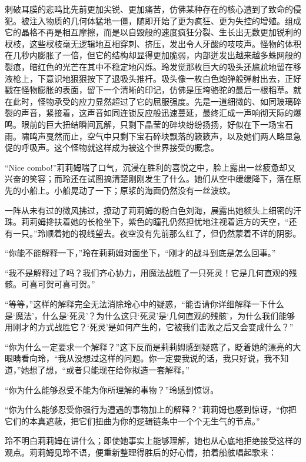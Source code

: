 刺破耳膜的悲鸣比先前更加尖锐、更加痛苦，仿佛某种存在的核心遭到了致命的侵犯。被注入物质的几何体猛地一僵，随即开始了更为疯狂、更为失控的增殖。组成它的晶格不再是相互摩擦，而是以自毁般的速度疯狂分裂、生长出无数更加锐利的杈枝，这些杈枝毫无逻辑地互相穿刺、挤压，发出令人牙酸的吱吱声。怪物的体积在几秒内膨胀了一倍，但它的结构却显得更加脆弱，内部迸发出越来越多蛛网般的裂痕，暗红色的光芒在其中不稳定地闪烁。玲发觉那枚巨大的吸头还尴尬地留在移液枪上，下意识地狠狠按下了退吸头推杆。吸头像一枚白色炮弹般弹射出去，正好戳在怪物膨胀的表面，留下一个清晰的印记，仿佛是压垮骆驼的最后一根稻草。就在此时，怪物承受的应力显然超过了它的屈服强度。先是一道细微的、如同玻璃碎裂的声音，紧接着，这声音如同连锁反应般迅速蔓延，最终汇成一声响彻天际的爆鸣。眼前的巨大扭结瞬间瓦解，只剩下晶莹的碎块纷纷扬扬，好似在下一场宝石雨。啸鸣声戛然而止，空气中只剩下宝石碎块飘落的簌簌声，以及她们两人略显急促的呼吸声。这个怪物就这样成为被这个世界接受的概念。

“Nice combo!”莉莉姆喘了口气，沉浸在胜利的喜悦之中，脸上露出一丝疲惫却又兴奋的笑容；而玲还在试图搞清楚刚刚发生了什么。她们从空中缓缓降下，落在原先的小船上。小船晃动了一下；原浆的海面仍然没有一丝波纹。

一阵从未有过的微风拂过，撩动了莉莉姆的粉白色刘海，展露出她额头上细密的汗珠。莉莉姆搀扶着她的长枪坐下，紫色的瞳孔仍然担忧地注视着远方的天空，“还有一只。”玲顺着她的视线望去。夜空没有先前那么红了，但仍然蒙着不详的阴影。

“你能不能解释一下，”玲在莉莉姆对面坐下，“刚才的战斗到底是怎么回事。”

“我不是解释过了吗？我们齐心协力，用魔法战胜了一只死灵！它是几何直观的残骸。可喜可贺可喜可贺。”

“等等，”这样的解释完全无法消除玲心中的疑惑，“能否请你详细解释一下什么是‘魔法’，什么是‘死灵’？为什么这只‘死灵’是‘几何直观的残骸’，为什么我们能够用刚才的方式战胜它？‘死灵’是如何产生的，它被我们击败之后又会变成什么？”

“你为什么一定要求一个解释？”这下反而是莉莉姆感到疑惑了，眨着她的漂亮的大眼睛看向玲，“我从没想过这样的问题。你一定要我说的话，我只好说，我不知道，”她想了想，“或者只能现在给你拟造一套解释。”

“你为什么能够忍受不能为你所理解的事物？”玲感到惊讶。

“你为什么能够忍受你强行为遭遇的事物加上的解释？”莉莉姆也感到惊讶，“你把它们的本真遮蔽，把它们扭曲为你的逻辑链条中一个个无生气的节点。”

玲不明白莉莉姆在讲什么；即使她事实上能够理解，她也从心底地拒绝接受这样的观点。莉莉姆见玲不语，便重新整理得胜后的好心情，拍着船舷唱起歌来：


